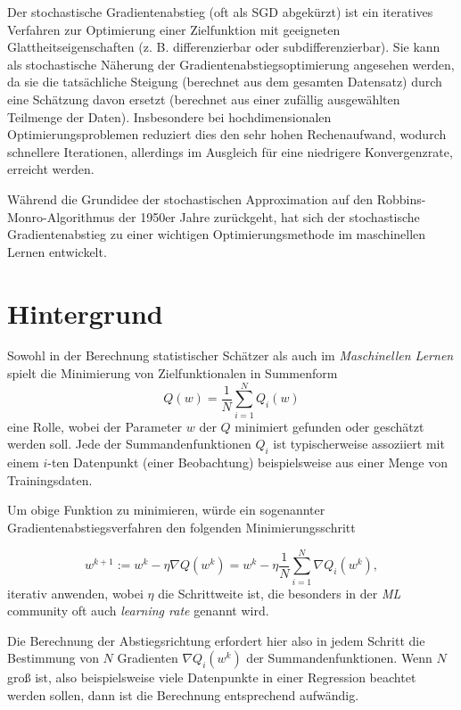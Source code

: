 \documentclass[]{book}
\theoremstyle{definition}
\theoremstyle{definition}
\theoremstyle{definition}
\theoremstyle{definition}
\theoremstyle{remark}
\begin{document}
Der stochastische Gradientenabstieg (oft als SGD abgekürzt) ist ein iteratives Verfahren zur Optimierung einer Zielfunktion mit geeigneten Glattheitseigenschaften (z. B. differenzierbar oder subdifferenzierbar). Sie kann als stochastische Näherung der Gradientenabstiegsoptimierung angesehen werden, da sie die tatsächliche Steigung (berechnet aus dem gesamten Datensatz) durch eine Schätzung davon ersetzt (berechnet aus einer zufällig ausgewählten Teilmenge der Daten). Insbesondere bei hochdimensionalen Optimierungsproblemen reduziert dies den sehr hohen Rechenaufwand, wodurch schnellere Iterationen, allerdings im Ausgleich für eine niedrigere Konvergenzrate, erreicht werden.

Während die Grundidee der stochastischen Approximation auf den Robbins-Monro-Algorithmus der 1950er Jahre zurückgeht, hat sich der stochastische Gradientenabstieg zu einer wichtigen Optimierungsmethode im maschinellen Lernen entwickelt.

\hypertarget{hintergrund}{%
\section{Hintergrund}\label{hintergrund}}

Sowohl in der Berechnung statistischer Schätzer als auch im \emph{Maschinellen Lernen} spielt die Minimierung von Zielfunktionalen in Summenform
\begin{equation*}
Q(w) = \frac{1}{N}\sum_{i=1}^N Q_i(w)
\end{equation*}
eine Rolle, wobei der Parameter \(w\) der
\(Q\) minimiert gefunden oder geschätzt werden soll.
Jede der Summandenfunktionen \(Q_i\) ist typischerweise assoziiert mit einem \(i\)-ten Datenpunkt (einer Beobachtung) beispielsweise aus einer Menge von Trainingsdaten.

Um obige Funktion zu minimieren, würde ein sogenannter Gradientenabstiegsverfahren den folgenden Minimierungsschritt

\begin{equation*}
w^{k+1} := w^{k} - \eta \nabla Q(w^k) = w^k - \eta \frac{1}{N} \sum_{i=1}^N \nabla Q_i(w^k),
\end{equation*}
iterativ anwenden, wobei \(\eta\) die Schrittweite ist, die besonders in der \emph{ML} community oft auch \emph{learning rate} genannt wird.

Die Berechnung der Abstiegsrichtung erfordert hier also in jedem Schritt die Bestimmung von \(N\) Gradienten \(\nabla Q_i(w^k)\) der Summandenfunktionen. Wenn \(N\) groß ist, also beispielsweise viele Datenpunkte in einer Regression beachtet werden sollen, dann ist die Berechnung entsprechend aufwändig.
\end{document}
